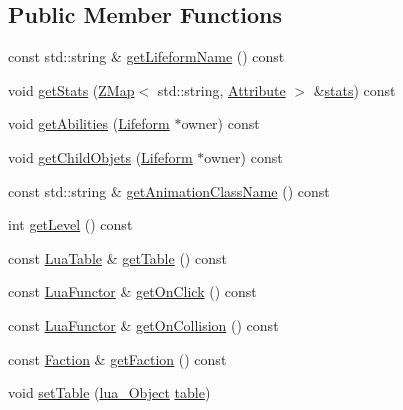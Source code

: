 \subsection*{Public Member Functions}
\begin{DoxyCompactItemize}
\item 
const std\+::string \& \hyperlink{classZeta_1_1LifeformClass_a9fcea8174f8b84f648162ec3968dc2bc}{get\+Lifeform\+Name} () const 
\item 
void \hyperlink{classZeta_1_1LifeformClass_ab55b76b464c8df908b1fb79495fa5828}{get\+Stats} (\hyperlink{namespaceZeta_a9af2e12c4e432d2a1725f19e5a648a04}{Z\+Map}$<$ std\+::string, \hyperlink{classZeta_1_1Attribute}{Attribute} $>$ \&\hyperlink{classZeta_1_1LifeformClass_a4451d269f7dc4c5544d8b89b63a420ca}{stats}) const 
\item 
void \hyperlink{classZeta_1_1LifeformClass_a292adb3fb19fbca90235bf0b855a9306}{get\+Abilities} (\hyperlink{classZeta_1_1Lifeform}{Lifeform} $\ast$owner) const 
\item 
void \hyperlink{classZeta_1_1LifeformClass_a3368d8263af6c9af9ac6b78fcf10f924}{get\+Child\+Objets} (\hyperlink{classZeta_1_1Lifeform}{Lifeform} $\ast$owner) const 
\item 
const std\+::string \& \hyperlink{classZeta_1_1LifeformClass_a6ff99eb86e194319ab458c5052d2e27a}{get\+Animation\+Class\+Name} () const 
\item 
int \hyperlink{classZeta_1_1LifeformClass_a362d94718a6e35b0745555b3c8eba592}{get\+Level} () const 
\item 
const \hyperlink{classZeta_1_1LuaTable}{Lua\+Table} \& \hyperlink{classZeta_1_1LifeformClass_a924311bd77f7ce2432d6cdea75411f0b}{get\+Table} () const 
\item 
const \hyperlink{classZeta_1_1LuaFunctor}{Lua\+Functor} \& \hyperlink{classZeta_1_1LifeformClass_a1c4fec0e840f301224c3412f51046482}{get\+On\+Click} () const 
\item 
const \hyperlink{classZeta_1_1LuaFunctor}{Lua\+Functor} \& \hyperlink{classZeta_1_1LifeformClass_a9e113478f4a990860fe2de198f59f24a}{get\+On\+Collision} () const 
\item 
const \hyperlink{classZeta_1_1Faction}{Faction} \& \hyperlink{classZeta_1_1LifeformClass_a6f8697377531c7c68f5ae1000877757e}{get\+Faction} () const 
\item 
void \hyperlink{classZeta_1_1LifeformClass_aeb670ab1c93460280608ce915b899071}{set\+Table} (\hyperlink{ZetaConfig_8hpp_ae7be32b73848041a60f2412f72bbb221}{lua\+\_\+\+Object} \hyperlink{classZeta_1_1LifeformClass_aa8731df77ae7bd670fea69e182266dd3}{table})

\end{DoxyCompactItemize}
